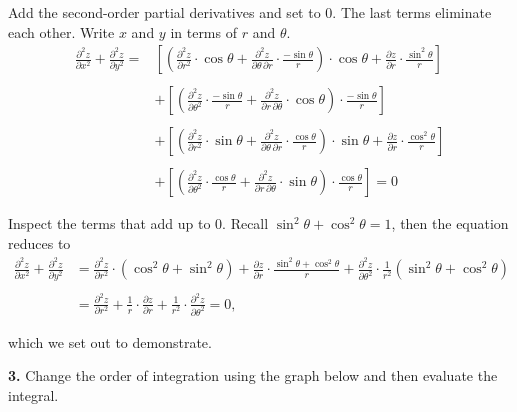 \documentclass{article}
\begin{document}
Add the second-order partial derivatives and set to $0$. The last terms eliminate each other. Write $x$ and $y$ in terms of $r$ and $\theta$.
\begin{align*}\frac{\partial^2 z}{\partial x^2}+\frac{\partial^2 z}{\partial y^2}=&\left[\left(\frac{\partial^2z}{\partial r^2}\cdot\cos\theta +\frac{\partial^2z}{\partial\theta\,\partial r}\cdot\frac{-\sin\theta}{r}\right)\cdot\cos\theta+\frac{\partial z}{\partial r}\cdot\frac{\sin^2\theta}{r}\right]\\\\&+\left[\left(\frac{\partial^2z}{\partial\theta^2}\cdot\frac{-\sin\theta}{r} + \frac{\partial^2z}{\partial r\,\partial\theta}\cdot\cos\theta\right)\cdot\frac{-\sin\theta}{r}\right]\\\\&+\left[\left(\frac{\partial^2z}{\partial r^2}\cdot\sin\theta +\frac{\partial^2z}{\partial\theta\,\partial r}\cdot\frac{\cos\theta}{r}\right)\cdot\sin\theta+\frac{\partial z}{\partial r}\cdot\frac{\cos^2\theta}{r}\right]\\\\&+\left[\left(\frac{\partial^2z}{\partial\theta^2}\cdot\frac{\cos\theta}{r} + \frac{\partial^2z}{\partial r\,\partial\theta}\cdot\sin\theta\right)\cdot\frac{\cos\theta}{r}\right]=0\end{align*}

\newpage

Inspect the terms that add up to $0$. Recall $\sin^2\theta+\cos^2\theta=1$, then the equation reduces to
\begin{align*}
\frac{\partial^2z}{\partial x^2}+\frac{\partial^2z}{\partial y^2}&=\frac{\partial^2z}{\partial r^2}\cdot\left(\cos^2\theta+\sin^2\theta\right)+\frac{\partial z}{\partial r}\cdot\frac{\sin^2\theta+\cos^2\theta}{r}+\frac{\partial^2z}{\partial\theta^2}\cdot\frac1{r^2}\left(\sin^2\theta+\cos^2\theta\right)\\\\&=\frac{\partial^2z}{\partial r^2}+\frac1r\cdot\frac{\partial z}{\partial r}+\frac1{r^2}\cdot\frac{\partial^2z}{\partial\theta^2}=0,
\end{align*}

which we set out to demonstrate.

\vspace{1em}

\textbf{3.} Change the order of integration using the graph below and then evaluate the integral.
\end{document}
